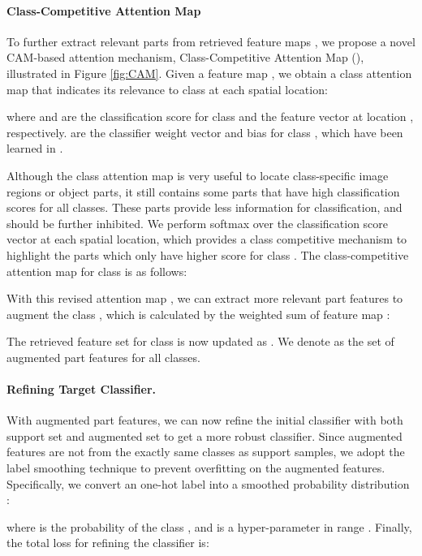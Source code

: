 \documentclass{article}
\begin{document}
\paragraph{Class-Competitive Attention Map} To further extract relevant parts from retrieved feature maps , we propose a novel CAM-based \cite{zhou2016learning} attention mechanism, Class-Competitive Attention Map (), illustrated in Figure \ref{fig:CAM}. Given a feature map , we obtain a class attention map  that indicates its relevance to class  at each spatial location:

where  and  are the classification score for class  and the feature vector at location , respectively.  are the classifier weight vector and bias for class , which have been learned in .


Although the class attention map  is very useful to locate class-specific image regions or object parts, it still contains some parts that have high classification scores for all classes. These parts provide less information for classification, and should be further inhibited. We perform softmax over the classification score vector  at each spatial location, which provides a class competitive mechanism to highlight the parts which only have higher score for class . The class-competitive attention map  for class  is as follows:





With this revised attention map , we can extract more relevant part features  to augment the class , which is calculated by the weighted sum of feature map :

The retrieved feature set for class  is now updated as . We denote  as the set of augmented part features for all classes.

\paragraph{Refining Target Classifier.} 
With augmented part features, we can now refine the initial classifier with both support set  and augmented set  to get a more robust classifier. Since augmented features are not from the exactly same classes as support samples, we adopt the label smoothing technique \cite{Szegedy2016RethinkingTI} to prevent overfitting on the augmented features. Specifically, we convert an one-hot label  into a smoothed probability distribution :

where  is the probability of the class , and  is a hyper-parameter in range . Finally, the total loss for refining the classifier is:
\end{document}
